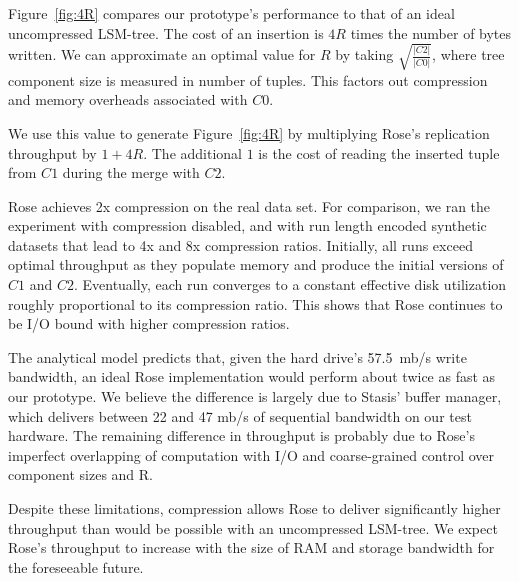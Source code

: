 \documentclass{vldb}
\newcommand{\rows}{Rose\xspace}
\newcommand{\rowss}{Rose's\xspace}
\begin{document}

Figure~\ref{fig:4R} compares our prototype's performance to that of an
ideal uncompressed LSM-tree.  The cost of an insertion is $4R$ times
the number of bytes written.  We can approximate an optimal value for
$R$ by taking $\sqrt{\frac{|C2|}{|C0|}}$, where tree component size is
measured in number of tuples.  This factors out compression and memory
overheads associated with $C0$.

We use this value to
generate Figure~\ref{fig:4R} by multiplying \rowss replication
throughput by $1 + 4R$.  The additional $1$ is the cost of reading the
inserted tuple from $C1$ during the merge with $C2$.

\rows achieves 2x compression on the real data set.  For comparison,
we ran the experiment with compression disabled, and with
run length encoded synthetic datasets that lead to 4x and 8x compression
ratios.  Initially, all runs exceed optimal throughput as they
populate memory and produce the initial versions of $C1$ and $C2$.
Eventually, each run converges to a constant effective disk
utilization roughly proportional to its compression ratio.  This shows
that \rows continues to be I/O bound with higher compression ratios.

The analytical model predicts that, given the hard drive's 57.5~mb/s
write bandwidth, an ideal \rows implementation would perform about
twice as fast as our prototype.  We believe the difference is largely
due to Stasis' buffer manager, which delivers between 22 and 47 mb/s
of sequential bandwidth on our test hardware.  The remaining
difference in throughput is probably due to \rowss imperfect
overlapping of computation with I/O and coarse-grained control over
component sizes and R.

Despite these limitations, compression allows \rows to deliver significantly
higher throughput than would be possible with an uncompressed LSM-tree.  We expect
\rowss throughput to increase with the size of RAM and storage
bandwidth for the foreseeable future.

\end{document}
